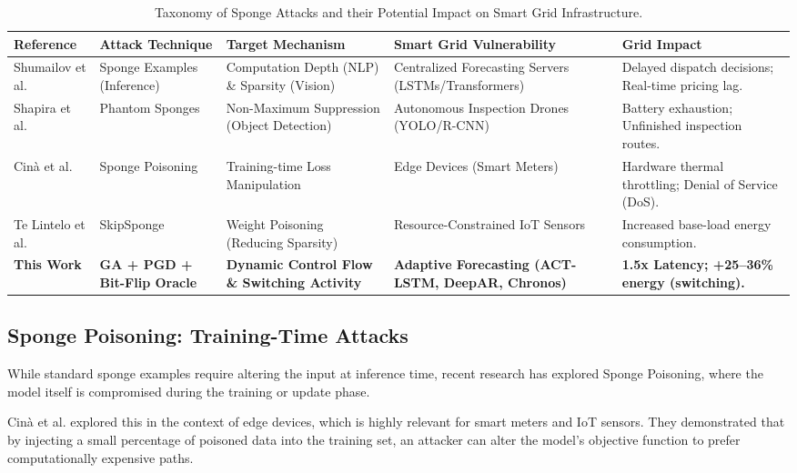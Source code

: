 \begin{table}[t]
    \centering
    \caption{Taxonomy of Sponge Attacks and their Potential Impact on Smart Grid Infrastructure.}
    \label{tab:literature_review}
    \renewcommand{\arraystretch}{1.3}
    \begin{tabular}{l p{3cm} p{3.5cm} p{4cm} p{3cm}}
        \toprule
        \textbf{Reference} & \textbf{Attack Technique} & \textbf{Target Mechanism} & \textbf{Smart Grid Vulnerability} & \textbf{Grid Impact} \\
        \midrule
        Shumailov et al. \cite{shumailov2021sponge} & Sponge Examples (Inference) & Computation Depth (NLP) \& Sparsity (Vision) & Centralized Forecasting Servers (LSTMs/Transformers) & Delayed dispatch decisions; Real-time pricing lag. \\
        \hline
        Shapira et al. \cite{shapira2023phantom} & Phantom Sponges & Non-Maximum Suppression (Object Detection) & Autonomous Inspection Drones (YOLO/R-CNN) & Battery exhaustion; Unfinished inspection routes. \\
        \hline
        Cinà et al. \cite{cina2022sponge} & Sponge Poisoning & Training-time Loss Manipulation & Edge Devices (Smart Meters) & Hardware thermal throttling; Denial of Service (DoS). \\
        \hline
        Te Lintelo et al. \cite{telintelo2024skip} & SkipSponge & Weight Poisoning (Reducing Sparsity) & Resource-Constrained IoT Sensors & Increased base-load energy consumption. \\
        \hline
        \textbf{This Work} & \textbf{GA + PGD + Bit-Flip Oracle} & \textbf{Dynamic Control Flow \& Switching Activity} & \textbf{Adaptive Forecasting (ACT-LSTM, DeepAR, Chronos)} & \textbf{1.5x Latency; +25--36\% energy (switching).} \\
        \bottomrule
    \end{tabular}
\end{table}

\subsection{Sponge Poisoning: Training-Time Attacks}
While standard sponge examples require altering the input at inference time, recent research has explored Sponge Poisoning, where the model itself is compromised during the training or update phase.

Cinà et al. \cite{cina2022sponge} explored this in the context of edge devices, which is highly relevant for smart meters and IoT sensors. They demonstrated that by injecting a small percentage of poisoned data into the training set, an attacker can alter the model's objective function to prefer computationally expensive paths.

